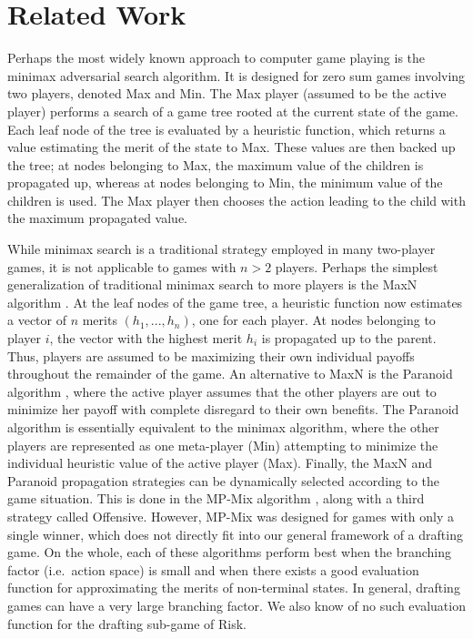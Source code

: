 \documentclass[letterpaper]{article}
\numberwithin{equation}{section}
\numberwithin{theorem}{section}
\numberwithin{lemma}{section}
\numberwithin{df}{section}
\begin{document}
\section{Related Work}

Perhaps the most widely known approach to computer game playing is the minimax adversarial search algorithm.  It is designed for zero sum games involving two players, denoted Max and Min.  The Max player (assumed to be the active player) performs a search of a game tree rooted at the current state of the game.  Each leaf node of the tree is evaluated by a heuristic function, which returns a value estimating the merit of the state to Max.  These values are then backed up the tree; at nodes belonging to Max, the maximum value of the children is propagated up, whereas at nodes belonging to Min, the minimum value of the children is used.  The Max player then chooses the action leading to the child with the maximum propagated value.


While minimax search is a traditional strategy employed in many two-player games, it is not applicable to games with $n > 2$ players.  Perhaps the simplest generalization of traditional minimax search to more players is the MaxN algorithm \cite{MaxN}.  At the leaf nodes of the game tree, a heuristic function now estimates a vector of $n$ merits $(h_1, ..., h_n)$, one for each player.  At nodes belonging to player $i$, the vector with the highest merit $h_i$ is propagated up to the parent.  Thus, players are assumed to be maximizing their own individual payoffs throughout the remainder of the game.  An alternative to MaxN is the Paranoid algorithm \cite{Paranoid}, where the active player assumes that the other players are out to minimize her payoff with complete disregard to their own benefits.  The Paranoid algorithm is essentially equivalent to the minimax algorithm, where the other players are represented as one meta-player (Min) attempting to minimize the individual heuristic value of the active player (Max).  Finally, the MaxN and Paranoid propagation strategies can be dynamically selected according to the game situation.  This is done in the MP-Mix algorithm \cite{ZuckFelnerKraus2009}, along with a third strategy called Offensive.  However, MP-Mix was designed for games with only a single winner, which does not directly fit into our general framework of a drafting game.  On the whole, each of these algorithms perform best when the branching factor (i.e.~action space) is small and when there exists a good evaluation function for approximating the merits of non-terminal states.  In general, drafting games can have a very large branching factor.  We also know of no such evaluation function for the drafting sub-game of Risk.
\end{document}
